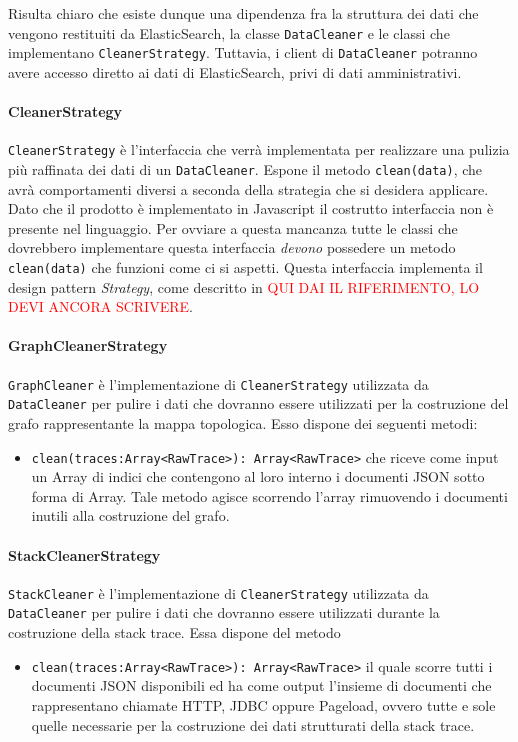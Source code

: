 Risulta chiaro che esiste dunque una dipendenza fra la struttura dei dati che vengono restituiti da ElasticSearch, la classe \texttt{DataCleaner} e le classi che implementano \texttt{CleanerStrategy}. Tuttavia, i client di \texttt{DataCleaner} potranno avere accesso diretto ai dati di ElasticSearch, privi di dati amministrativi.
	
\paragraph{CleanerStrategy}\Spazio
\label{sec:CleanerStrategy}
\texttt{CleanerStrategy} è l'interfaccia che verrà implementata per realizzare una pulizia più raffinata dei dati di un \texttt{DataCleaner}. Espone il metodo \texttt{clean(data)}, che avrà comportamenti diversi a seconda della strategia che si desidera applicare. Dato che il prodotto è implementato in Javascript il costrutto interfaccia non è presente nel linguaggio. Per ovviare a questa mancanza tutte le classi che dovrebbero implementare questa interfaccia \emph{devono} possedere un metodo \texttt{clean(data)} che funzioni come ci si aspetti. Questa interfaccia implementa il design pattern \emph{Strategy}, come descritto in \textcolor{red}{QUI DAI IL RIFERIMENTO, LO DEVI ANCORA SCRIVERE}.
	
	
\paragraph{GraphCleanerStrategy}\Spazio
\label{sec:GraphCleaner}

\texttt{GraphCleaner} è l'implementazione di \texttt{CleanerStrategy} utilizzata da \texttt{DataCleaner} per pulire i dati che dovranno essere utilizzati per la costruzione del grafo rappresentante la mappa topologica. Esso dispone dei seguenti metodi:
\begin{itemize}
	\item \texttt{clean(traces:Array<RawTrace>): Array<RawTrace>} che riceve come input un Array di indici che contengono al loro interno i documenti JSON sotto forma di Array. Tale metodo agisce scorrendo l'array rimuovendo i documenti inutili alla costruzione del grafo.
\end{itemize}

\paragraph{StackCleanerStrategy} \Spazio
\label{sec:StackCleaner}

\texttt{StackCleaner} è l'implementazione di \texttt{CleanerStrategy} utilizzata da \texttt{DataCleaner} per pulire i dati che dovranno essere utilizzati durante la costruzione della stack trace. Essa dispone del metodo
\begin{itemize}
	\item \texttt{clean(traces:Array<RawTrace>): Array<RawTrace>} il quale scorre tutti i documenti JSON disponibili ed ha come output l'insieme di documenti che rappresentano chiamate HTTP, JDBC oppure Pageload, ovvero tutte e sole quelle necessarie per la costruzione dei dati strutturati della stack trace.
\end{itemize}



